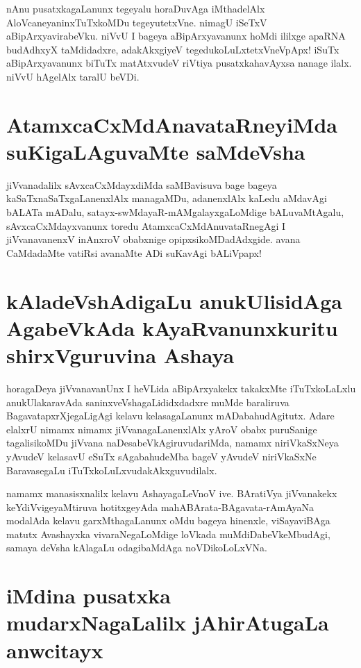 nAnu pusatxkagaLanunx tegeyalu horaDuvAga iMthadelAlx AloVcaneyaninxTuTxkoMDu tegeyutetxVne. nimagU iSeTxV aBipArxyavirabeVku. niVvU I bageya aBipArxyavanunx hoMdi ililxge  apaRNA budAdhxyX taMdidadxre, adakAkxgiyeV tegedukoLuLxtetxVneVpApx! iSuTx aBipArxyavanunx biTuTx matAtxvudeV riVtiya pusatxkahavAyxsa nanage ilalx. niVvU hAgelAlx taralU beVDi.

\section*{AtamxcaCxMdAnavataRneyiMda suKigaLAguvaMte saMdeVsha}

jiVvanadalilx sAvxcaCxMdayxdiMda saMBavisuva bage bageya kaSaTxnaSaTxgaLanenxlAlx managaMDu, adanenxlAlx kaLedu aMdavAgi bALATa mADalu, satayx-swMdayaR-mAMgalayxgaLoMdige bALuvaMtAgalu, sAvxcaCxMdayxvanunx toredu AtamxcaCxMdAnuvataRnegAgi I jiVvanavanenxV inAnxroV obabxnige opipxsikoMDadAdxgide. avana CaMdadaMte vatiRsi avanaMte ADi suKavAgi bALiVpapx!

\section*{kAladeVshAdigaLu anukUlisidAga AgabeVkAda kAyaRvanunxkuritu shirxVguruvina Ashaya}

horagaDeya jiVvanavanUnx I heVLida aBipArxyakekx takakxMte iTuTxkoLaLxlu anukUlakaravAda saninxveVshagaLididxdadxre muMde baraliruva BagavatapxrXjegaLigAgi kelavu kelasagaLanunx mADabahudAgitutx. Adare elalxrU nimamx nimamx jiVvanagaLanenxlAlx yAroV obabx puruSanige tagalisikoMDu jiVvana naDesabeVkAgiruvudariMda, namamx niriVkaSxNeya yAvudeV kelasavU eSuTx sAgabahudeMba bageV yAvudeV niriVkaSxNe BaravasegaLu iTuTxkoLuLxvudakAkxguvudilalx.

namamx manasisxnalilx kelavu AshayagaLeVnoV ive. BAratiVya jiVvanakekx keYdiVvigeyaMtiruva hotitxgeyAda mahABArata-BAgavata-rAmAyaNa modalAda kelavu garxMthagaLanunx oMdu bageya hinenxle, viSayaviBAga matutx Avashayxka vivaraNegaLoMdige loVkada muMdiDabeVkeMbudAgi, samaya deVsha kAlagaLu odagibaMdAga noVDikoLoLxVNa.

\section*{iMdina pusatxka mudarxNagaLalilx jAhirAtugaLa anwcitayx}

